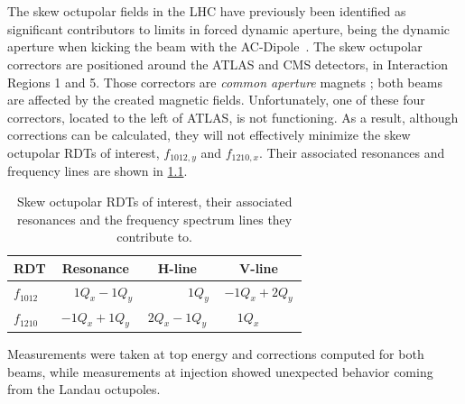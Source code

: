 \chapter{}
\label{chapter:skew_octupole_fields}
\thumbforchapter{}
\chaptertoc{}


\section{}

The skew octupolar fields in the LHC have previously been identified as significant contributors to 
limits in forced dynamic aperture, being the dynamic aperture when kicking the beam with the
AC-Dipole~\cite{carlier_nonlinear_2020}. The skew octupolar correctors are positioned around the
ATLAS and CMS detectors, in Interaction Regions 1 and 5. Those correctors are \textit{common
aperture} magnets ; both beams are affected by the created magnetic fields. Unfortunately, one of
these four correctors, located to the left of ATLAS, is not functioning. As a result, although
corrections can be calculated, they will not effectively minimize the skew octupolar RDTs of
interest, $f_{1012,y}$ and $f_{1210,x}$. 
Their associated resonances and frequency lines are shown in
\cref{tab:skew_octupolar:resonances_rdts}.

\begin{table}[!htb]
    \centering
    \begin{tabular}{lccc}
      \toprule
      RDT         & Resonance                &  H-line                    & V-line         \\
      \midrule
      $f_{1012}$  & $\phantom{-}1Q_x - 1Q_y$ &  $\phantom{2Q_x-\ \,}1Q_y$ & $-1Q_x + 2Q_y$ \\
      $f_{1210}$  & $-1Q_x + 1Q_y$           &  $2Q_x - 1Q_y$             & $\phantom{-}1Q_x\phantom{+2Q_y\ \,}$    \\
      \bottomrule
    \end{tabular}
    \caption{Skew octupolar RDTs of interest, their associated resonances and the frequency spectrum
    lines they contribute to.}
    \label{tab:skew_octupolar:resonances_rdts}
\end{table}
  
Measurements were taken at top energy and corrections computed for both beams, while measurements at
injection showed unexpected behavior coming from the Landau octupoles.




